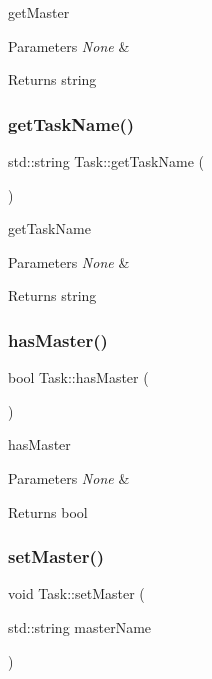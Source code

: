 get\+Master 
\begin{DoxyParams}{Parameters}
{\em None} & \\
\hline
\end{DoxyParams}
\begin{DoxyReturn}{Returns}
string 
\end{DoxyReturn}
\mbox{\label{class_task_abb5dae8b5244e54c7d5015b2e788d803}} 
\subsubsection{\texorpdfstring{get\+Task\+Name()}{getTaskName()}}
{\footnotesize\ttfamily std\+::string Task\+::get\+Task\+Name (\begin{DoxyParamCaption}{ }\end{DoxyParamCaption})}

get\+Task\+Name 
\begin{DoxyParams}{Parameters}
{\em None} & \\
\hline
\end{DoxyParams}
\begin{DoxyReturn}{Returns}
string 
\end{DoxyReturn}
\mbox{\label{class_task_a7a23a48a20e3381d22438a6657944a00}} 
\subsubsection{\texorpdfstring{has\+Master()}{hasMaster()}}
{\footnotesize\ttfamily bool Task\+::has\+Master (\begin{DoxyParamCaption}{ }\end{DoxyParamCaption})}

has\+Master 
\begin{DoxyParams}{Parameters}
{\em None} & \\
\hline
\end{DoxyParams}
\begin{DoxyReturn}{Returns}
bool 
\end{DoxyReturn}
\mbox{\label{class_task_a3ffb8dc55564036408702006b64a5759}} 
\subsubsection{\texorpdfstring{set\+Master()}{setMaster()}}
{\footnotesize\ttfamily void Task\+::set\+Master (\begin{DoxyParamCaption}\item[{std\+::string}]{master\+Name }\end{DoxyParamCaption})}

